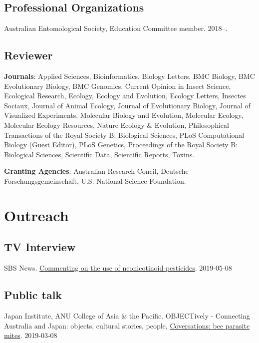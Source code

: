 \documentclass[11pt]{article}
\begin{document}
\subsection{Professional Organizations}
\ind Australian Entomological Society, Education Committee member. 2018--.

\subsection{Reviewer}
\ind \textbf{Journals}: Applied Sciences, Bioinformatics, Biology Letters,
BMC Biology, BMC Evolutionary Biology, BMC Genomics, Current Opinion in
Insect Science, Ecological Research, Ecology, Ecology and Evolution,
Ecology Letters, Insectes Sociaux, Journal of Animal Ecology, Journal of
Evolutionary Biology, Journal of Visualized Experiments, Molecular
Biology and Evolution, Molecular Ecology, Molecular Ecology Resources,
Nature Ecology \& Evolution, Philosophical Transactions of the Royal
Society B: Biological Sciences, PLoS Computational Biology (Guest
Editor), PLoS Genetics, Proceedings of the Royal Society B: Biological
Sciences, Scientific Data, Scientific Reports, Toxins. 

\ind \textbf{Granting Agencies}: Australian Research Concil, Deutsche
Forschungsgemeinschaft, U.S. National Science Foundation. 


\section{Outreach}

\subsection{TV Interview}
\ind SBS News.  \href{https://www.sbs.com.au/news/australian-beekeepers-call-for-ban-on-potentially-harmful-pesticide}{Commenting on the use of neonicotinoid pesticides}. 2019-05-08

\subsection{Public talk}
\ind Japan Institute, ANU College of Asia \& the Pacific. OBJECTively - Connecting Australia and Japan: objects, cultural stories,
people, \href{http://japaninstitute.anu.edu.au/events/objectively-connecting-australia-and-japan-objects-cultural-stories-people}{Coversations: bee parasitc mites}. 2019-03-08
\end{document}
